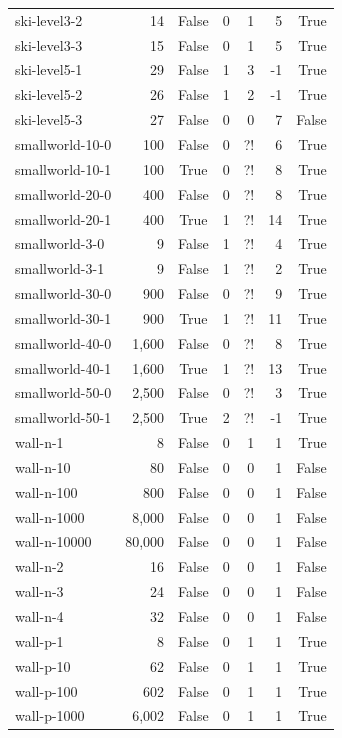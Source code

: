 \begin{table}[ht]
\begin{tabular}{l r c r r r r}
ski-level3-2 & 14 & False & 0 & 1 & 5 & True \\
ski-level3-3 & 15 & False & 0 & 1 & 5 & True \\
ski-level5-1 & 29 & False & 1 & 3 & -1 & True \\
ski-level5-2 & 26 & False & 1 & 2 & -1 & True \\
ski-level5-3 & 27 & False & 0 & 0 & 7 & False \\
smallworld-10-0 & 100 & False & 0 & ?! & 6 & True \\
smallworld-10-1 & 100 & True & 0 & ?! & 8 & True \\
smallworld-20-0 & 400 & False & 0 & ?! & 8 & True \\
smallworld-20-1 & 400 & True & 1 & ?! & 14 & True \\
smallworld-3-0 & 9 & False & 1 & ?! & 4 & True \\
smallworld-3-1 & 9 & False & 1 & ?! & 2 & True \\
smallworld-30-0 & 900 & False & 0 & ?! & 9 & True \\
smallworld-30-1 & 900 & True & 1 & ?! & 11 & True \\
smallworld-40-0 & 1,600 & False & 0 & ?! & 8 & True \\
smallworld-40-1 & 1,600 & True & 1 & ?! & 13 & True \\
smallworld-50-0 & 2,500 & False & 0 & ?! & 3 & True \\
smallworld-50-1 & 2,500 & True & 2 & ?! & -1 & True \\
wall-n-1 & 8 & False & 0 & 1 & 1 & True \\
wall-n-10 & 80 & False & 0 & 0 & 1 & False \\
wall-n-100 & 800 & False & 0 & 0 & 1 & False \\
wall-n-1000 & 8,000 & False & 0 & 0 & 1 & False \\
wall-n-10000 & 80,000 & False & 0 & 0 & 1 & False \\
wall-n-2 & 16 & False & 0 & 0 & 1 & False \\
wall-n-3 & 24 & False & 0 & 0 & 1 & False \\
wall-n-4 & 32 & False & 0 & 0 & 1 & False \\
wall-p-1 & 8 & False & 0 & 1 & 1 & True \\
wall-p-10 & 62 & False & 0 & 1 & 1 & True \\
wall-p-100 & 602 & False & 0 & 1 & 1 & True \\
wall-p-1000 & 6,002 & False & 0 & 1 & 1 & True \\

\end{tabular}
\end{table}
